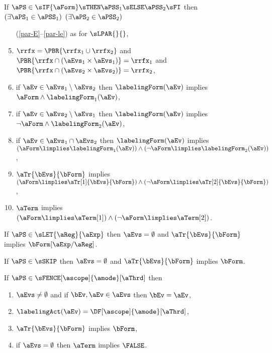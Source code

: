 \begin{definition}
  If $\aPS \in \sIF{\aForm}\sTHEN\aPSS_1\sELSE\aPSS_2\sFI$ then
  $(\exists\aPS_1\in\aPSS_1)$ $(\exists\aPS_2\in\aPSS_2)$
  \begin{enumerate}[topsep=0pt]
    \setcounter{enumi}{3}
  \item[(\ref{par-E}--\ref{par-le})] as for $\sLPAR{}{}$,
  \item
    \label{if-rf}
    ${\rrfx}=\PBR{{\rrfx_1}\cup{\rrfx_2}}$
    and
    $\PBR{{\rrfx}\cap(\aEvs_1\times\aEvs_1)}={\rrfx_1}$
    and
    $\PBR{{\rrfx}\cap(\aEvs_2\times\aEvs_2)}={\rrfx_2}$, 
  \item \label{if-kappa1}
    if $\aEv\in\aEvs_1\setminus\aEvs_2$ then $\labelingForm(\aEv)$ implies $\aForm\land\labelingForm_1(\aEv)$,
  \item \label{if-kappa2}
    if $\aEv\in\aEvs_2\setminus\aEvs_1$ then $\labelingForm(\aEv)$ implies $\neg\aForm\land\labelingForm_2(\aEv)$, 
  \item \label{if-kappa12}
    if $\aEv\in\aEvs_1\cap\aEvs_2$ then
    $\labelingForm(\aEv)$ implies $(\aForm\limplies\labelingForm_1(\aEv))\land(\neg\aForm\limplies\labelingForm_2(\aEv))$,
  \item \label{if-tau}
    $\aTr{\bEvs}{\bForm}$ implies
    $(\aForm\limplies\aTr[1]{\bEvs}{\bForm})\land(\neg\aForm\limplies\aTr[2]{\bEvs}{\bForm})$,
  \item \label{if-term}
    $\aTerm$ implies
    $(\aForm\limplies\aTerm[1])\land(\neg\aForm\limplies\aTerm[2])$.
  \end{enumerate}
  \medskip

  If $\aPS\in\sLET{\aReg}{\aExp}$ then $\aEvs = \emptyset$ and
  $\aTr{\bEvs}{\bForm}$ implies $\bForm[\aExp/\aReg]$.

  If $\aPS\in\sSKIP$ then $\aEvs = \emptyset$ and
  $\aTr{\bEvs}{\bForm}$ implies $\bForm$.

  If $\aPS \in \sFENCE[\ascope]{\amode}[\aThrd]$ then
  \begin{enumerate}[topsep=0pt]
  \item%
     $\aEvs\neq\emptyset$ and if $\bEv,\aEv\in\aEvs$ then $\bEv=\aEv$,
  \item%
    $\labelingAct(\aEv) = \DF[\ascope]{\amode}[\aThrd]$,
  \item%
    $\aTr{\bEvs}{\bForm}$ implies $\bForm$,
  \item
    if $\aEvs=\emptyset$ then $\aTerm$ implies $\FALSE$.
  \end{enumerate}
  \medskip


\end{definition}
